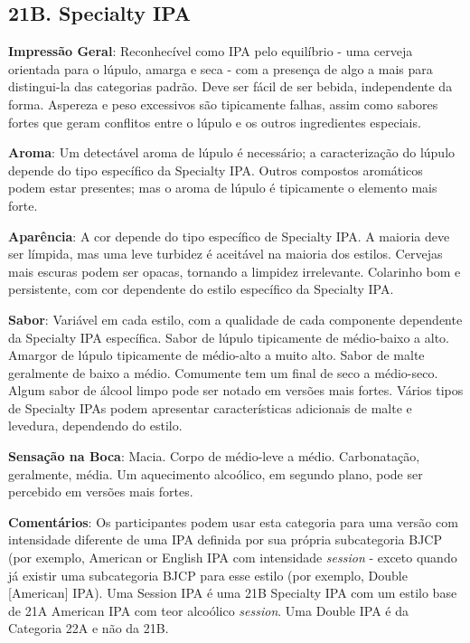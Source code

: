 \subsection*{21B. Specialty IPA}
\textbf{Impressão Geral}: Reconhecível como IPA pelo equilíbrio - uma cerveja orientada para o lúpulo, amarga e seca - com a presença de algo a mais para distingui-la das categorias padrão. Deve ser fácil de ser bebida, independente da forma. Aspereza e peso excessivos são tipicamente falhas, assim como sabores fortes que geram conflitos entre o lúpulo e os outros ingredientes especiais.

\textbf{Aroma}: Um detectável aroma de lúpulo é necessário; a caracterização do lúpulo depende do tipo específico da Specialty IPA. Outros compostos aromáticos podem estar presentes; mas o aroma de lúpulo é tipicamente o elemento mais forte.

\textbf{Aparência}: A cor depende do tipo específico de Specialty IPA. A maioria deve ser límpida, mas uma leve turbidez é aceitável na maioria dos estilos. Cervejas mais escuras podem ser opacas, tornando a limpidez irrelevante. Colarinho bom e persistente, com cor dependente do estilo específico da Specialty IPA.

\textbf{Sabor}: Variável em cada estilo, com a qualidade de cada componente dependente da Specialty IPA específica. Sabor de lúpulo tipicamente de médio-baixo a alto. Amargor de lúpulo tipicamente de médio-alto a muito alto. Sabor de malte geralmente de baixo a médio. Comumente tem um final de seco a médio-seco. Algum sabor de álcool limpo pode ser notado em versões mais fortes. Vários tipos de Specialty IPAs podem apresentar características adicionais de malte e levedura, dependendo do estilo.

\textbf{Sensação na Boca}: Macia. Corpo de médio-leve a médio. Carbonatação, geralmente, média. Um aquecimento alcoólico, em segundo plano, pode ser percebido em versões mais fortes.

\textbf{Comentários}: Os participantes podem usar esta categoria para uma versão com intensidade diferente de uma IPA definida por sua própria subcategoria BJCP (por exemplo, American or English IPA com intensidade \textit{session} - exceto quando já existir uma subcategoria BJCP para esse estilo (por exemplo, Double [American] IPA). Uma Session IPA é uma 21B Specialty IPA com um estilo base de 21A American IPA com teor alcoólico \textit{session}. Uma Double IPA é da Categoria 22A e não da 21B.

